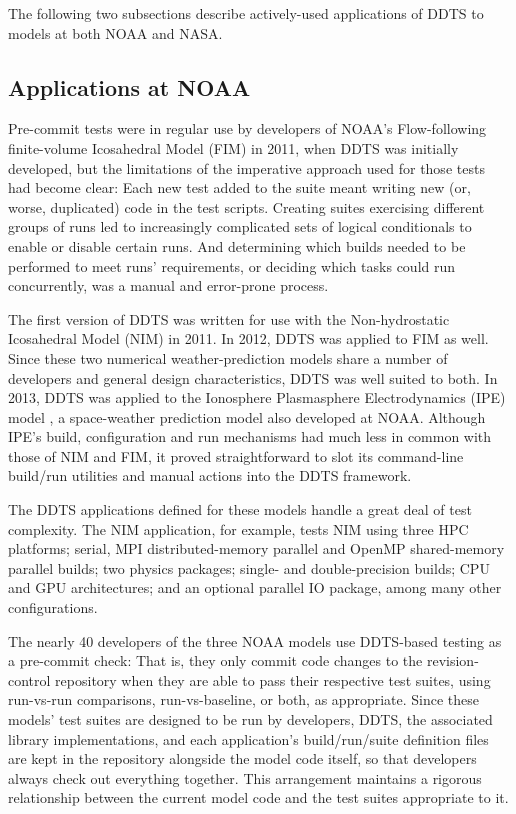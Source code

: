 \documentclass[conference]{IEEEtran}
\begin{document}
The following two subsections describe actively-used applications of DDTS to models at both NOAA and NASA.

\subsection{Applications at NOAA}

Pre-commit tests were in regular use by developers of NOAA's Flow-following finite-volume Icosahedral Model (FIM) \cite{fim} in 2011, when DDTS was initially developed, but the limitations of the imperative approach used for those tests had become clear: Each new test added to the suite meant writing new (or, worse, duplicated) code in the test scripts. Creating suites exercising different groups of runs led to increasingly complicated sets of logical conditionals to enable or disable certain runs. And determining which builds needed to be performed to meet runs' requirements, or deciding which tasks could run concurrently, was a manual and error-prone process.

The first version of DDTS was written for use with the Non-hydrostatic Icosahedral Model (NIM) \cite{nim} in 2011. In 2012, DDTS was applied to FIM as well. Since these two numerical weather-prediction models share a number of developers and general design characteristics, DDTS was well suited to both. In 2013, DDTS was applied to the Ionosphere Plasmasphere Electrodynamics (IPE) model \cite{ipe}, a space-weather prediction model also developed at NOAA. Although IPE's build, configuration and run mechanisms had much less in common with those of NIM and FIM, it proved straightforward to slot its command-line build/run utilities and manual actions into the DDTS framework.

The DDTS applications defined for these models handle a great deal of test complexity. The NIM application, for example, tests NIM using three HPC platforms; serial, MPI distributed-memory parallel and OpenMP shared-memory parallel builds; two physics packages; single- and double-precision builds; CPU and GPU architectures; and an optional parallel IO package, among many other configurations.

The nearly 40 developers of the three NOAA models use DDTS-based testing as a pre-commit check: That is, they only commit code changes to the revision-control repository when they are able to pass their respective test suites, using run-vs-run comparisons, run-vs-baseline, or both, as appropriate. Since these models' test suites are designed to be run by developers, DDTS, the associated library implementations, and each application's build/run/suite definition files are kept in the repository alongside the model code itself, so that developers always check out everything together. This arrangement maintains a rigorous relationship between the current model code and the test suites appropriate to it.
\end{document}
